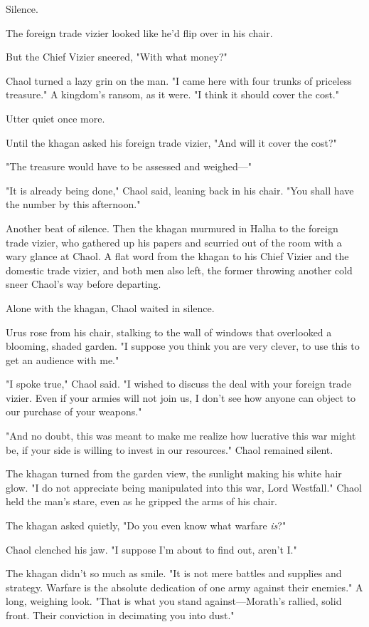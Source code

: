 Silence.

The foreign trade vizier looked like he'd flip over in his chair.

But the Chief Vizier sneered, "With what money?"

Chaol turned a lazy grin on the man. "I came here with four trunks of priceless treasure." A kingdom's ransom, as it were. "I think it should cover the cost."

Utter quiet once more.

Until the khagan asked his foreign trade vizier, "And will it cover the cost?"

"The treasure would have to be assessed and weighed---"

"It is already being done," Chaol said, leaning back in his chair. "You shall have the number by this afternoon."

Another beat of silence. Then the khagan murmured in Halha to the foreign trade vizier, who gathered up his papers and scurried out of the room with a wary glance at Chaol. A flat word from the khagan to his Chief Vizier and the domestic trade vizier, and both men also left, the former throwing another cold sneer Chaol's way before departing.

Alone with the khagan, Chaol waited in silence.

Urus rose from his chair, stalking to the wall of windows that overlooked a blooming, shaded garden. "I suppose you think you are very clever, to use this to get an audience with me."

"I spoke true," Chaol said. "I wished to discuss the deal with your foreign trade vizier. Even if your armies will not join us, I don't see how anyone can object to our purchase of your weapons."

"And no doubt, this was meant to make me realize how lucrative this war might be, if your side is willing to invest in our resources." Chaol remained silent.

The khagan turned from the garden view, the sunlight making his white hair glow. "I do not appreciate being manipulated into this war, Lord Westfall." Chaol held the man's stare, even as he gripped the arms of his chair.

The khagan asked quietly, "Do you even know what warfare \emph{is}?"

Chaol clenched his jaw. "I suppose I'm about to find out, aren't I."

The khagan didn't so much as smile. "It is not mere battles and supplies and strategy. Warfare is the absolute dedication of one army against their enemies." A long, weighing look. "That is what you stand against---Morath's rallied, solid front. Their conviction in decimating you into dust."

